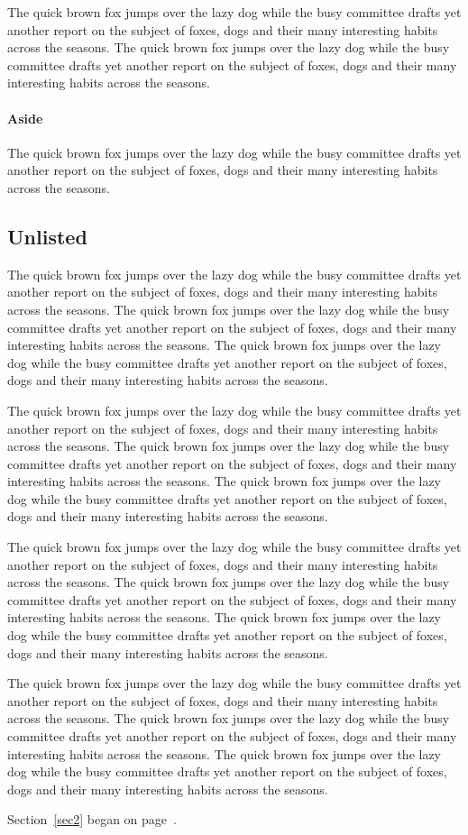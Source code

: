 \documentclass{article}
\begin{document}
The quick brown fox jumps over the lazy dog while the busy committee drafts yet another report on the subject of foxes, dogs and their many interesting habits across the seasons. The quick brown fox jumps over the lazy dog while the busy committee drafts yet another report on the subject of foxes, dogs and their many interesting habits across the seasons. 

\paragraph{Aside} The quick brown fox jumps over the lazy dog while the busy committee drafts yet another report on the subject of foxes, dogs and their many interesting habits across the seasons. 
\subsection*{Unlisted}
The quick brown fox jumps over the lazy dog while the busy committee drafts yet another report on the subject of foxes, dogs and their many interesting habits across the seasons. The quick brown fox jumps over the lazy dog while the busy committee drafts yet another report on the subject of foxes, dogs and their many interesting habits across the seasons. The quick brown fox jumps over the lazy dog while the busy committee drafts yet another report on the subject of foxes, dogs and their many interesting habits across the seasons. 

The quick brown fox jumps over the lazy dog while the busy committee drafts yet another report on the subject of foxes, dogs and their many interesting habits across the seasons. The quick brown fox jumps over the lazy dog while the busy committee drafts yet another report on the subject of foxes, dogs and their many interesting habits across the seasons. The quick brown fox jumps over the lazy dog while the busy committee drafts yet another report on the subject of foxes, dogs and their many interesting habits across the seasons. 

The quick brown fox jumps over the lazy dog while the busy committee drafts yet another report on the subject of foxes, dogs and their many interesting habits across the seasons. The quick brown fox jumps over the lazy dog while the busy committee drafts yet another report on the subject of foxes, dogs and their many interesting habits across the seasons. The quick brown fox jumps over the lazy dog while the busy committee drafts yet another report on the subject of foxes, dogs and their many interesting habits across the seasons. 

The quick brown fox jumps over the lazy dog while the busy committee drafts yet another report on the subject of foxes, dogs and their many interesting habits across the seasons. The quick brown fox jumps over the lazy dog while the busy committee drafts yet another report on the subject of foxes, dogs and their many interesting habits across the seasons. The quick brown fox jumps over the lazy dog while the busy committee drafts yet another report on the subject of foxes, dogs and their many interesting habits across the seasons. 

Section~\ref{sec2} began on page~\pageref{sec2}.
\end{document}
